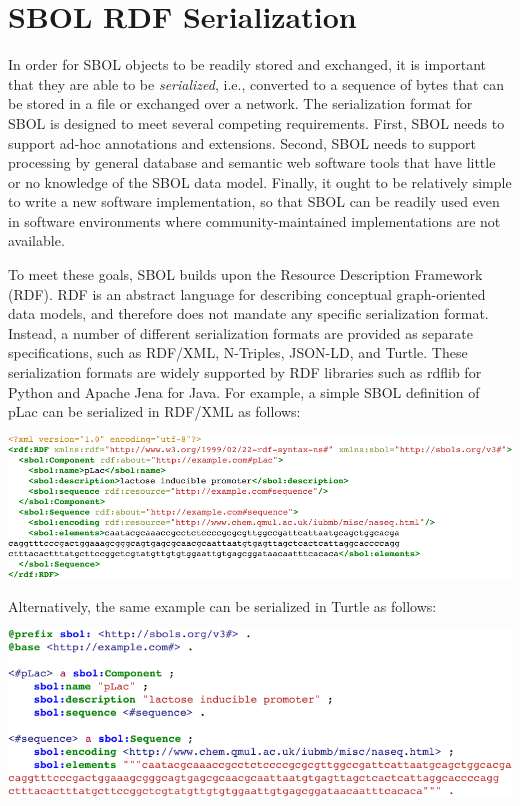 \section{SBOL RDF Serialization}
\label{sec:serialization}

In order for SBOL objects to be readily stored and exchanged, it is important that they are able to be {\em serialized}, i.e., converted to a sequence of bytes that can be stored in a file or exchanged over a network.  The serialization format for SBOL is designed to meet several competing requirements. 
First, SBOL needs to support ad-hoc annotations and extensions. 
Second, SBOL needs to support processing by general database and semantic web software tools that have little or no knowledge of the SBOL data model. 
Finally, it ought to be relatively simple to write a new software implementation, so that SBOL can be readily used even in software environments where community-maintained implementations are not available.

To meet these goals, SBOL builds upon the Resource Description Framework (RDF).  RDF is an abstract language for describing conceptual graph-oriented data models, and therefore does not mandate any specific serialization format.  Instead, a number of different serialization formats are provided as separate specifications, such as RDF/XML, N-Triples, JSON-LD, and Turtle.  These serialization formats are widely supported by RDF libraries such as rdflib for Python and Apache Jena for Java.   For example, a simple SBOL definition of pLac can be serialized in RDF/XML as follows:

\vspace{3mm}
\includegraphics{example_serialization/example_rdfxml.pdf}

Alternatively, the same example can be serialized in Turtle as follows:

\vspace{3mm}
\includegraphics{example_serialization/example_turtle.pdf}

